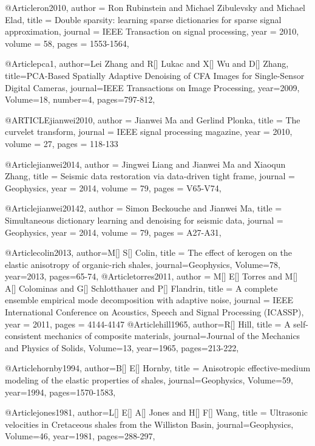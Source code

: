 {@Article{ron2010,
  author = 	 {Ron Rubinstein and Michael Zibulevsky and Michael Elad},
  title = 	 {Double sparsity: learning sparse dictionaries for sparse signal approximation},
  journal = 	 {IEEE Transaction on signal processing},
  year = 	 2010,
  volume =	 58,
  pages =	 {1553-1564},
}

@Article{pca1,
  author={Lei Zhang and R[] Lukac and X[] Wu and D[] Zhang},
  title={PCA-Based Spatially Adaptive Denoising of CFA Images for Single-Sensor Digital Cameras},
  journal={IEEE Transactions on Image Processing},
  year=2009,
  Volume=18,
  number=4,
  pages={797-812},
}

@ARTICLE{jianwei2010,
  author = {Jianwei Ma and Gerlind Plonka},
  title = {The curvelet transform},
  journal = {IEEE signal processing magazine},
  year = {2010},
  volume = {27},
  pages = {118-133}
}

@Article{jianwei2014,
  author = 	 {Jingwei Liang and Jianwei Ma and Xiaoqun Zhang},
  title = 	 {Seismic data restoration via data-driven tight frame},
  journal = 	 {Geophysics},
  year = 	 2014,
  volume =	 79,
  pages =	 {V65-V74},
}

@Article{jianwei20142,
  author = 	 {Simon Beckouche and Jianwei Ma},
  title = 	 {Simultaneous dictionary learning and denoising for seismic data},
  journal = 	 {Geophysics},
  year = 	 2014,
  volume =	 79,
  pages =	 {A27-A31},
}

@Article{colin2013,
  author={M[] S[] Colin},
  title = {The effect of kerogen on the elastic anisotropy of organic-rich shales},
  journal={Geophysics},
  Volume=78,
  year=2013,
  pages={65-74},
}
@Article{torres2011,
  author = 	 {M[] E[] Torres and M[] A[] Colominas and G[] Schlotthauer and P[] Flandrin},
  title = 	 {A complete ensemble empirical mode decomposition with adaptive noise},
  journal = 	 {IEEE International Conference on Acoustics, Speech and Signal Processing (ICASSP)},
  year = 	 2011,
  pages = 	 {4144-4147}
}
@Article{hill1965,
  author={R[] Hill},
  title = {A self-consistent mechanics of composite materials},
  journal={Journal of the Mechanics and Physics of Solids},
  Volume=13,
  year=1965,
  pages={213-222},
}

@Article{hornby1994,
  author={B[] E[] Hornby},
  title = {Anisotropic effective-medium modeling of the elastic properties of shales},
  journal={Geophysics},
  Volume=59,
  year=1994,
  pages={1570-1583},
}

@Article{jones1981,
  author={L[] E[] A[] Jones and H[] F[] Wang},
  title = {Ultrasonic velocities in Cretaceous shales from the Williston Basin},
  journal={Geophysics},
  Volume=46,
  year=1981,
  pages={288-297},
}


}

